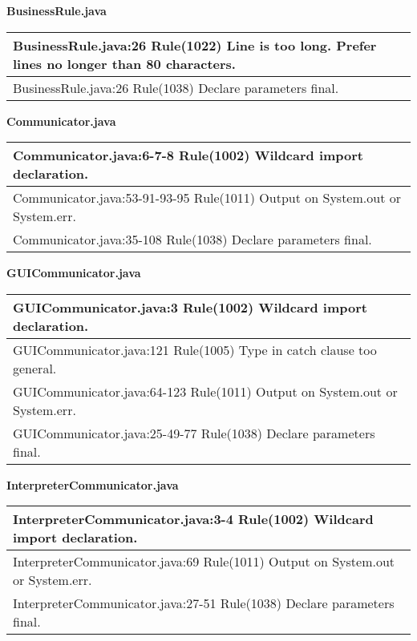 \textbf{BusinessRule.java}
\begin{center}
\begin{tabular}{|p{12cm}|} \hline
BusinessRule.java:26 Rule(1022) Line is too long. Prefer lines no longer than 80 characters. \\ \hline
BusinessRule.java:26 Rule(1038) Declare parameters final. \\ \hline
\end{tabular}
\end{center}

\textbf{Communicator.java}
\begin{center}
\begin{tabular}{|p{12cm}|} \hline
Communicator.java:6-7-8 Rule(1002) Wildcard import declaration. \\ \hline
Communicator.java:53-91-93-95 Rule(1011) Output on System.out or System.err. \\ \hline
Communicator.java:35-108 Rule(1038) Declare parameters final. \\ \hline
\end{tabular}
\end{center}

\textbf{GUICommunicator.java}
\begin{center}
\begin{tabular}{|p{12cm}|} \hline
GUICommunicator.java:3 Rule(1002) Wildcard import declaration. \\ \hline
GUICommunicator.java:121 Rule(1005) Type in catch clause too general. \\ \hline
GUICommunicator.java:64-123 Rule(1011) Output on System.out or System.err. \\ \hline
GUICommunicator.java:25-49-77 Rule(1038) Declare parameters final. \\ \hline
\end{tabular}
\end{center}

\textbf{InterpreterCommunicator.java}
\begin{center}
\begin{tabular}{|p{12cm}|} \hline
InterpreterCommunicator.java:3-4 Rule(1002) Wildcard import declaration. \\ \hline
InterpreterCommunicator.java:69 Rule(1011) Output on System.out or System.err. \\ \hline
InterpreterCommunicator.java:27-51 Rule(1038) Declare parameters final.\\ \hline
\end{tabular}
\end{center}

